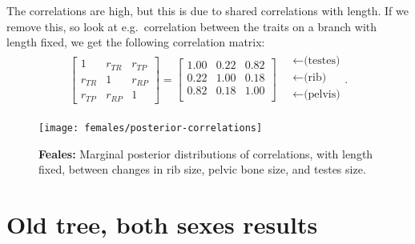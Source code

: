 \documentclass{article}
\begin{document}
The correlations are high, but this is due to shared correlations with length.
If we remove this, so look at e.g.\ correlation between the traits on a branch with length fixed,
we get the following correlation matrix:
\begin{align}
\begin{bmatrix}
  1 & r_{TR} & r_{TP} \\ 
  r_{TR} & 1 & r_{RP} \\ 
  r_{TP} & r_{RP} & 1 
 \end{bmatrix}
 =
\begin{bmatrix}
   1.00 & 0.22 & 0.82 \\ 
   0.22 & 1.00 & 0.18 \\ 
   0.82 & 0.18 & 1.00 \\ 
 \end{bmatrix}
\quad \begin{matrix}
  \leftarrow \text{(testes)} \\
  \leftarrow \text{(rib)} \\
  \leftarrow \text{(pelvis)} \\
\end{matrix}  .
\end{align}


\begin{figure}[ht]
  \begin{center}
    \texttt{[image: females/posterior-correlations]}
  \end{center}
  \caption{\textbf{Feales:} Marginal posterior distributions of correlations, with length fixed,
  between changes in rib size, pelvic bone size, and testes size.
  \label{fig:posterior_cors}
  }
\end{figure}


\section{Old tree, both sexes results}
\end{document}
